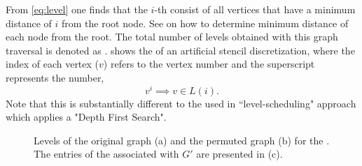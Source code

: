 From \cref{eq:level} one finds that the $i$-th \level consist of all vertices that have a minimum distance of $i$ from the root node. See  on how to determine minimum distance of each node from the root. The total number of levels obtained with this graph traversal is denoted as \totalLvl.  shows the  \levels of an artificial stencil discretization, where the index of each vertex ($v$) refers to the vertex number and the superscript represents the \level number, \ie
\begin{equation}\label{eq:node_notation}
	v^i \implies v \in L(i).
\end{equation}
Note that this is substantially different to the \levels used in ``level-scheduling" \cite{saad} approach which applies a "Depth First Search".

\begin{figure}[tbhp]
	\centering
	\hspace{1em}
	\hspace{1em}
	\caption{Levels of the original graph (a) and the permuted graph (b) for the \stex. The entries of  the \levelPtr associated with $G'$ are presented in (c).}
	\label{fig:2d-7pt_step_1_2}
\end{figure}


